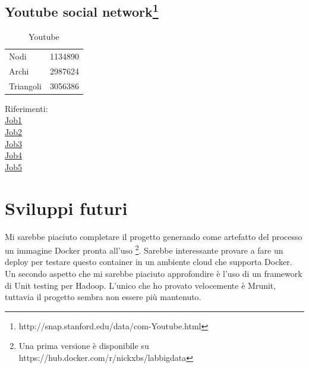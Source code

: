 \documentclass[paper=a4, fontsize=11pt]{scrartcl}	%
\numberwithin{equation}{section}															%
\numberwithin{figure}{section}																%
\numberwithin{table}{section}																%
\begin{document}
\subsection{Youtube social network\protect\footnote{http://snap.stanford.edu/data/com-Youtube.html}} 

\begin{table}[]
	\centering
	\caption{Youtube}
	\label{my-label}
	\begin{tabular}{ll}
		Nodi		 & 1134890\\
		Archi		 & 2987624 \\
		Triangoli	& 3056386 \\
	\end{tabular}
\end{table}
Riferimenti:\\	
\href{http://hadoop-compute0.di.univr.it:50030/jobdetails.jsp?jobid=job_201603141010_12281}{Job1}\\
\href{http://hadoop-compute0.di.univr.it:50030/jobdetails.jsp?jobid=job_201603141010_12282}{Job2}\\
\href{http://hadoop-compute0.di.univr.it:50030/jobdetails.jsp?jobid=job_201603141010_12283}{Job3}\\
\href{http://hadoop-compute0.di.univr.it:50030/jobdetails.jsp?jobid=job_201603141010_12284}{Job4}\\
\href{http://hadoop-compute0.di.univr.it:50030/jobdetails.jsp?jobid=job_201603141010_12285}{Job5}\\

\section{Sviluppi futuri}
Mi sarebbe piaciuto completare il progetto generando come artefatto del processo un immagine Docker pronta all'uso \protect\footnote{Una prima versione è disponibile su https://hub.docker.com/r/nickxbs/labbigdata }. Sarebbe interessante provare a fare un deploy per testare questo container in un ambiente cloud che supporta Docker.\\
Un secondo aspetto che mi sarebbe piaciuto approfondire è l'uso di un framework di Unit testing per Hadoop. L'unico che ho provato velocemente è Mrunit, tuttavia il progetto sembra non essere più mantenuto.
\end{document}
